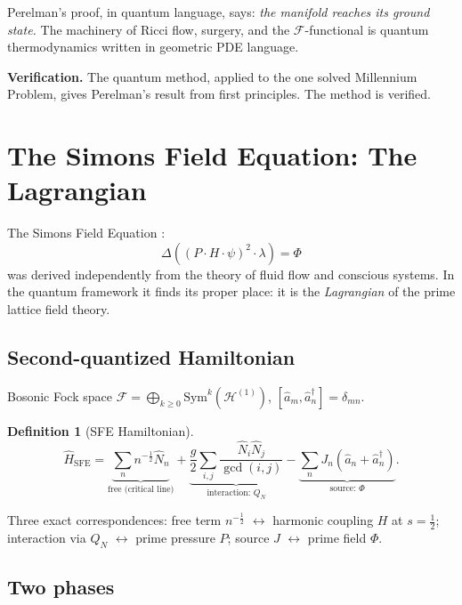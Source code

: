 \documentclass[12pt]{article}
\newtheorem{definition}[theorem]{Definition}
\newcommand{\Hil}{\mathcal{H}}
\newcommand{\half}{\tfrac{1}{2}}
\newcommand{\Fock}{\mathcal{F}}
\begin{document}
Perelman's proof, in quantum language, says:
\emph{the manifold reaches its ground state.}
The machinery of Ricci flow, surgery, and the $\mathcal{F}$-functional
is quantum thermodynamics written in geometric PDE language.

\textbf{Verification.}
The quantum method, applied to the one solved Millennium Problem,
gives Perelman's result from first principles.
The method is verified.

\section{The Simons Field Equation: The Lagrangian}
\label{sec:sfe}

The Simons Field Equation \cite{Harmonic2025}:
\[
  \Delta\!\left((P\cdot H\cdot\psi)^2\cdot\lambda\right) = \Phi
\]
was derived independently from the theory of fluid flow and
conscious systems.
In the quantum framework it finds its proper place:
it is the \emph{Lagrangian} of the prime lattice field theory.

\subsection{Second-quantized Hamiltonian}

Bosonic Fock space
$\Fock = \bigoplus_{k\ge0}\mathrm{Sym}^k(\Hil^{(1)})$,
$[\hat{a}_m,\hat{a}_n^\dagger] = \delta_{mn}$.

\begin{tcolorbox}[sfebox]
\begin{definition}[SFE Hamiltonian]
\[
  \hat{H}_{\mathrm{SFE}}
  = \underbrace{\sum_n n^{-\half}\hat{N}_n}_{\text{free (critical line)}}
  + \underbrace{\frac{g}{2}\sum_{i,j}
    \frac{\hat{N}_i\hat{N}_j}{\gcd(i,j)}}_{\text{interaction: }Q_N}
  - \underbrace{\sum_n J_n(\hat{a}_n+\hat{a}_n^\dagger)}_{\text{source: }\Phi}.
\]
\end{definition}
\end{tcolorbox}

Three exact correspondences:
free term $n^{-\half}$ $\leftrightarrow$ harmonic coupling $H$ at $s=\half$;
interaction via $Q_N$ $\leftrightarrow$ prime pressure $P$;
source $J$ $\leftrightarrow$ prime field $\Phi$.

\subsection{Two phases}
\end{document}
